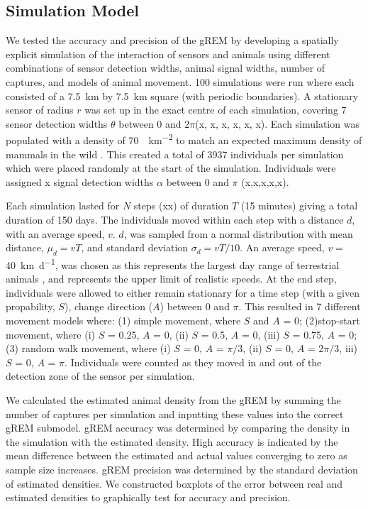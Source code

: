 \documentclass[a4paper,10pt,reqno,oneside]{amsart}
\begin{document}
\subsection{Simulation Model}

We tested the accuracy and precision of the gREM by developing a spatially explicit simulation of the interaction of sensors and animals using different combinations of sensor detection widths, animal signal widths, number of captures, and models of animal movement. 100 simulations were run where each consisted of a  \SI{7.5}{\kilo\meter} by \SI{7.5}{\kilo\meter} square (with periodic boundaries). A stationary sensor of radius $r$ was set up in the exact centre of each simulation, covering 7 sensor detection widths $\theta$ between 0 and $2\pi$(x, x, x, x, x, x). Each simulation was populated with a density of \SI{70}{\animals\per\kilo\meter\squared} to match an expected maximum density of mammals in the wild \citep{damuth1981population}. This created a total of 3937 individuals per simulation which were placed randomly at the start of the simulation. Individuals were assigned x signal detection widths $\alpha$ between 0 and $\pi$ (x,x,x,x,x).

Each simulation lasted for $N$ steps (xx) of duration $T$ (15 minutes) giving a total duration of 150 days. The individuals moved within each step with a distance $d$, with an average speed, $v$. $d$, was sampled from a normal distribution with mean distance, $\mu_d = vT$, and standard deviation $\sigma_d = vT/10$. An average speed, $v = $ \SI{40}{\kilo\meter \per \day}, was chosen as this represents the largest day range of terrestrial animals \citep{carbone2005far}, and represents the upper limit of realistic speeds. At the end step, individuals were allowed to either remain stationary for a time step (with a given propability, $S$), change direction ($A$) between 0 and $\pi$. This resulted in 7 different movement models where: (1) simple movement, where $S$ and $A$ = 0; (2)stop-start movement, where (i) $S$ = 0.25, $A$ = 0, (ii) $S$ = 0.5, $A$ = 0, (iii) $S$ = 0.75, $A$ = 0; (3) random walk movement, where (i) $S$ = 0, $A$ = $\pi/3$, (ii) $S$ = 0, $A$ = $2\pi/3$, iii) $S$ = 0, $A$ = $\pi$.  
Individuals were counted as they moved in and out of the detection zone of the sensor per simulation. 

We calculated the estimated animal density from the gREM by summing the number of captures per simulation and inputting these values into the correct gREM submodel. gREM accuracy was determined by comparing the density in the simulation with the estimated density. High accuracy is indicated by the mean difference between the estimated and actual values converging to zero as sample size increases. gREM precision was determined by the standard deviation of estimated densities. We constructed boxplots of the error between real and estimated densities to graphically test for accuracy and precision. 
\end{document}
